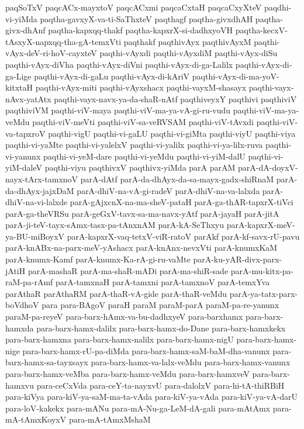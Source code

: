 {paqSoTxV
paqcACx-mayxtoV
paqcACxmi
paqcaCxtaH
paqcaCxyXteV
paqdhi-vi-yiMda
paqtha-gavxyX-va-ti-SaThxteV
paqthagf
paqtha-givxdhAH
paqtha-givx-dhAnf
paqtha-kapxqq-thakf
paqtha-kapxrX-si-dadhxyoVH
paqtha-kecxV-tAsxyX-napxqq-tha-gA-temxVti
paqthakf
paqthivAyx
paqthivAyxM
paqthi-vAyx-deV-ri-hoV-cayxteV
paqthi-vAyxdi
paqthi-vAyxdiM
paqthi-vAyx-diSu
paqthi-vAyx-diVha
paqthi-vAyx-diVni
paqthi-vAyx-di-ga-Lalilx
paqthi-vAyx-di-ga-Lige
paqthi-vAyx-di-gaLu
paqthi-vAyx-di-kAriV
paqthi-vAyx-di-ma-yoV-kitxtaH
paqthi-vAyx-miti
paqthi-vAyxshacx
paqthi-vayxM-shasayx
paqthi-vayx-nAvx-yatAtx
paqthi-vayx-navx-ya-da-shaR-nAtf
paqthiveyxY
paqthivi
paqthiviV
paqthiviVM
paqthi-viV-maya
paqthi-viV-ma-ya-vA-gi-ru-vudu
paqthi-viV-ma-ya-veMdu
paqthi-viV-meVti
paqthi-viV-sa-veRVSAM
paqthi-viV-tAvxdi
paqthi-viV-va-tapxroV
paqthi-vigU
paqthi-vi-gaLU
paqthi-vi-giMta
paqthi-viyU
paqthi-viya
paqthi-vi-yaMte
paqthi-vi-yalelxV
paqthi-vi-yalilx
paqthi-vi-ya-lilx-ruva
paqthi-vi-yanunx
paqthi-vi-yeM-dare
paqthi-vi-yeMdu
paqthi-vi-yiM-dalU
paqthi-vi-yiM-daleV
paqthi-viyu
paqthivxV
paqthivx-yiMda
parA
parAM
parA-dA-doyxV-nayx-tArx-tamxnoV
parA-dAtf
parA-da-dhAyx-da-sa-mayx-gadx-shiRnaM
parA-da-dhAyx-jajxDaM
parA-dhiV-na-vA-gi-radeV
parA-dhiV-na-va-lalxda
parA-dhiV-na-vi-lalxde
parA-gAjxcnX-na-ma-sheV-pataH
parA-ga-thAR-tapxrX-tiVci
parA-ga-theVRSu
parA-geGxV-tavx-sa-ma-navx-yAtf
parA-jayaH
parA-jitA
parA-ji-teV-tayx-sAmx-tasx-pa-tAnxnAM
parA-kA-SeThxyu
parA-kapxrX-meV-ya-BU-miBoyxV
parA-kapxrX-vaq-tetxV-viR-ratoV
parAkf
parA-kf-savx-rU-pavu
parA-knABx-na-parx-meV-yAshacx
parA-knAnx-nevxVti
parA-knumxKaM
parA-knumx-Kamf
parA-knumx-Ka-rA-gi-ru-vaMte
parA-ku-yAR-divx-parx-jAtiH
parA-mashaR
parA-ma-shaR-mADi
parA-ma-shiR-sade
parA-mu-kitx-pa-raM-pa-rAmf
parA-tamxnaH
parA-tamxni
parA-tamxnoV
parA-temxYva
parAthaR
parAthaRM
parA-thaR-vA-gide
parA-thaR-veMdu
parA-ya-tatx-parx-boVdhoV
para
para-BAgoV
paraH
paraM
paraM-parA
paraM-pa-re-yanunx
paraM-pa-reyeV
para-barx-hAmx-va-bu-dadhxyeV
para-barxhamx
para-barx-hamxda
para-barx-hamx-dalilx
para-barx-hamx-do-Dane
para-barx-hamxkekx
para-barx-hamxna
para-barx-hamx-nalilx
para-barx-hamx-nigU
para-barx-hamx-nige
para-barx-hamx-rU-pa-diMda
para-barx-hamx-saM-baM-dha-vanunx
para-barx-hamx-sa-tayxsayx
para-barx-hamx-va-lalx-veMdu
para-barx-hamx-vanunx
para-barx-hamx-veMba
para-barx-hamx-veMdu
para-barx-hamxveV
para-barx-hamxvu
para-ceCxVda
para-ceY-ta-nayxvU
para-dalolxV
para-hi-tA-thiRBiH
para-kiVya
para-kiV-ya-saM-ma-ta-vAda
para-kiV-ya-vAda
para-kiV-ya-vA-darU
para-loV-kakekx
para-mANu
para-mA-Nu-ga-LeM-dA-gali
para-mAtAmx
para-mA-tAmxKoyxV
para-mA-tAmxMshaM
}
